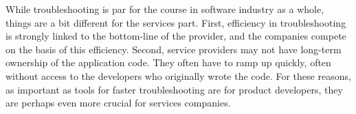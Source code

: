 While troubleshooting is par for the course in software industry as a whole, things are a bit different for the services part. First, efficiency in troubleshooting is strongly linked to the bottom-line of the provider, and the companies compete on the basis of this efficiency. Second, service providers may not have long-term ownership of the application code. They often have to ramp up quickly, often without access to the developers who originally wrote the code. For these reasons, as important as tools for faster troubleshooting are for product developers, they are perhaps even more crucial for services companies.

